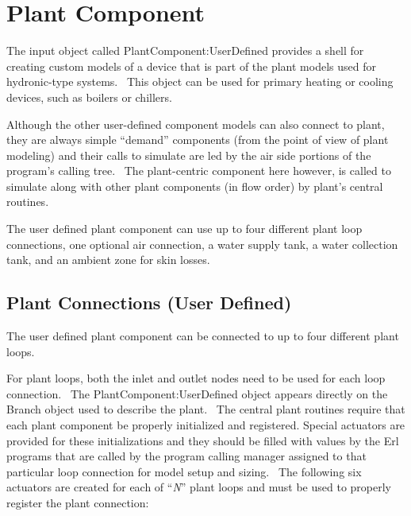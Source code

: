 \section{Plant Component}\label{plant-component}

The input object called PlantComponent:UserDefined provides a shell for creating custom models of a device that is part of the plant models used for hydronic-type systems.~ This object can be used for primary heating or cooling devices, such as boilers or chillers.

Although the other user-defined component models can also connect to plant, they are always simple ``demand'' components (from the point of view of plant modeling) and their calls to simulate are led by the air side portions of the program's calling tree.~ The plant-centric component here however, is called to simulate along with other plant components (in flow order) by plant's central routines.

The user defined plant component can use up to four different plant loop connections, one optional air connection, a water supply tank, a water collection tank, and an ambient zone for skin losses.

\subsection{Plant Connections (User Defined)}\label{plant-connections-001}

The user defined plant component can be connected to up to four different plant loops.

For plant loops, both the inlet and outlet nodes need to be used for each loop connection.~ The PlantComponent:UserDefined object appears directly on the Branch object used to describe the plant.~ The central plant routines require that each plant component be properly initialized and registered. Special actuators are provided for these initializations and they should be filled with values by the Erl programs that are called by the program calling manager assigned to that particular loop connection for model setup and sizing.~ The following six actuators are created for each of ``\emph{N}'' plant loops and must be used to properly register the plant connection:

